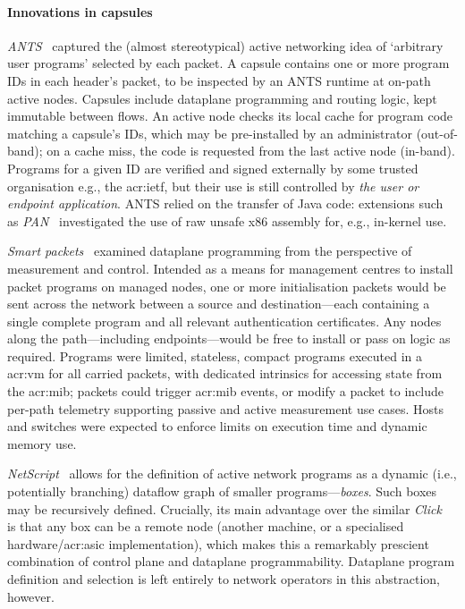 \paragraph{Innovations in capsules}
\emph{ANTS}~\parencite{ANTS,DBLP:conf/dance/Wetherall02} captured the (almost stereotypical) active networking idea of `arbitrary user programs' selected by each packet.
A capsule contains one or more program IDs in each header's packet, to be inspected by an ANTS runtime at on-path active nodes.
Capsules include dataplane programming and routing logic, kept immutable between flows.
An active node checks its local cache for program code matching a capsule's IDs, which may be pre-installed by an administrator (out-of-band); on a cache miss, the code is requested from the last active node (in-band).
Programs for a given ID are verified and signed externally by some trusted organisation e.g., the \gls{acr:ietf}, but their use is still controlled by \emph{the user or endpoint application}.
ANTS relied on the transfer of Java code: extensions such as \emph{PAN}~\parencite{PAN-activenet} investigated the use of raw unsafe x86 assembly for, e.g., in-kernel use.

\emph{Smart packets}~\parencite{DBLP:journals/tocs/SchwartzJSZRP00} examined dataplane programming from the perspective of measurement and control.
Intended as a means for management centres to install packet programs on managed nodes, one or more initialisation packets would be sent across the network between a source and destination---each containing a single complete program and all relevant authentication certificates.
Any nodes along the path---including endpoints---would be free to install or pass on logic as required.
Programs were limited, stateless, compact programs executed in a \gls{acr:vm} for all carried packets, with dedicated intrinsics for accessing state from the \gls{acr:mib}; packets could trigger \gls{acr:mib} events, or modify a packet to include per-path telemetry supporting passive and active measurement use cases.
Hosts and switches were expected to enforce limits on execution time and dynamic memory use.

\emph{NetScript}~\parencite{DBLP:journals/jsac/SilvaYF01} allows for the definition of active network programs as a dynamic (i.e., potentially branching) dataflow graph of smaller programs---\emph{boxes}.
Such boxes may be recursively defined.
Crucially, its main advantage over the similar \emph{Click}~\parencite{DBLP:conf/sosp/MorrisKJK99} is that any box can be a remote node (another machine, or a specialised hardware/\gls{acr:asic} implementation), which makes this a remarkably prescient combination of control plane and dataplane programmability.
Dataplane program definition and selection is left entirely to network operators in this abstraction, however.

